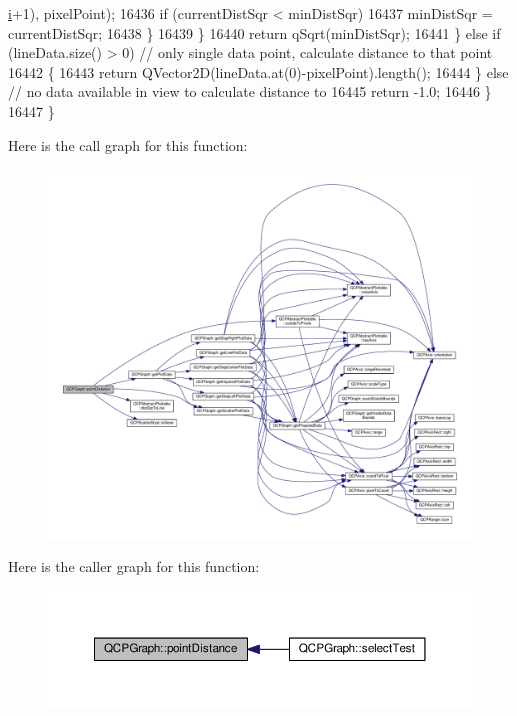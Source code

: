 \begin{DoxyCode}
      \hyperlink{_comparision_pictures_2_createtest_image_8m_a6f6ccfcf58b31cb6412107d9d5281426}{i}+1), pixelPoint);
16436           \textcolor{keywordflow}{if} (currentDistSqr < minDistSqr)
16437             minDistSqr = currentDistSqr;
16438         \}
16439       \}
16440       \textcolor{keywordflow}{return} qSqrt(minDistSqr);
16441     \} \textcolor{keywordflow}{else} \textcolor{keywordflow}{if} (lineData.size() > 0) \textcolor{comment}{// only single data point, calculate distance to that point}
16442     \{
16443       \textcolor{keywordflow}{return} QVector2D(lineData.at(0)-pixelPoint).length();
16444     \} \textcolor{keywordflow}{else} \textcolor{comment}{// no data available in view to calculate distance to}
16445       \textcolor{keywordflow}{return} -1.0;
16446   \}
16447 \}
\end{DoxyCode}


Here is the call graph for this function\+:\nopagebreak
\begin{figure}[H]
\begin{center}
\leavevmode
\includegraphics[width=350pt]{class_q_c_p_graph_af93762a12a481a7edb4b3dd9e330dff1_cgraph}
\end{center}
\end{figure}




Here is the caller graph for this function\+:\nopagebreak
\begin{figure}[H]
\begin{center}
\leavevmode
\includegraphics[width=350pt]{class_q_c_p_graph_af93762a12a481a7edb4b3dd9e330dff1_icgraph}
\end{center}
\end{figure}


